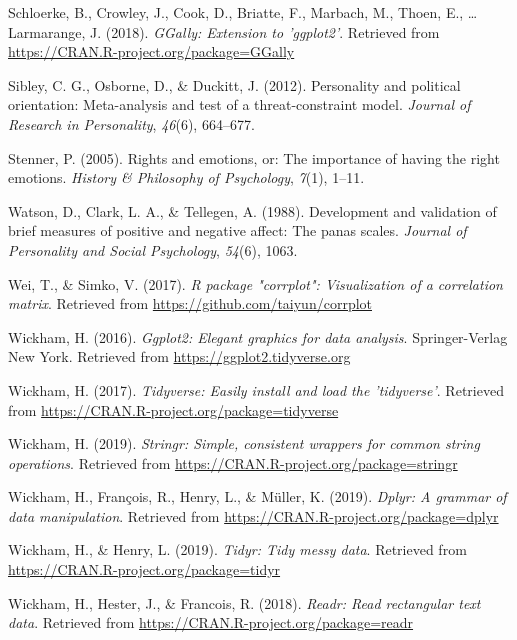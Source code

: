 \documentclass[man]{apa6}
\begin{document}
\leavevmode\hypertarget{ref-R-GGally}{}%
Schloerke, B., Crowley, J., Cook, D., Briatte, F., Marbach, M., Thoen, E., \ldots{} Larmarange, J. (2018). \emph{GGally: Extension to 'ggplot2'}. Retrieved from \url{https://CRAN.R-project.org/package=GGally}

\leavevmode\hypertarget{ref-sibley2012personality}{}%
Sibley, C. G., Osborne, D., \& Duckitt, J. (2012). Personality and political orientation: Meta-analysis and test of a threat-constraint model. \emph{Journal of Research in Personality}, \emph{46}(6), 664--677.

\leavevmode\hypertarget{ref-stenner2005rights}{}%
Stenner, P. (2005). Rights and emotions, or: The importance of having the right emotions. \emph{History \& Philosophy of Psychology}, \emph{7}(1), 1--11.

\leavevmode\hypertarget{ref-watson1988development}{}%
Watson, D., Clark, L. A., \& Tellegen, A. (1988). Development and validation of brief measures of positive and negative affect: The panas scales. \emph{Journal of Personality and Social Psychology}, \emph{54}(6), 1063.

\leavevmode\hypertarget{ref-R-corrplot2017}{}%
Wei, T., \& Simko, V. (2017). \emph{R package "corrplot": Visualization of a correlation matrix}. Retrieved from \url{https://github.com/taiyun/corrplot}

\leavevmode\hypertarget{ref-R-ggplot2}{}%
Wickham, H. (2016). \emph{Ggplot2: Elegant graphics for data analysis}. Springer-Verlag New York. Retrieved from \url{https://ggplot2.tidyverse.org}

\leavevmode\hypertarget{ref-R-tidyverse}{}%
Wickham, H. (2017). \emph{Tidyverse: Easily install and load the 'tidyverse'}. Retrieved from \url{https://CRAN.R-project.org/package=tidyverse}

\leavevmode\hypertarget{ref-R-stringr}{}%
Wickham, H. (2019). \emph{Stringr: Simple, consistent wrappers for common string operations}. Retrieved from \url{https://CRAN.R-project.org/package=stringr}

\leavevmode\hypertarget{ref-R-dplyr}{}%
Wickham, H., François, R., Henry, L., \& Müller, K. (2019). \emph{Dplyr: A grammar of data manipulation}. Retrieved from \url{https://CRAN.R-project.org/package=dplyr}

\leavevmode\hypertarget{ref-R-tidyr}{}%
Wickham, H., \& Henry, L. (2019). \emph{Tidyr: Tidy messy data}. Retrieved from \url{https://CRAN.R-project.org/package=tidyr}

\leavevmode\hypertarget{ref-R-readr}{}%
Wickham, H., Hester, J., \& Francois, R. (2018). \emph{Readr: Read rectangular text data}. Retrieved from \url{https://CRAN.R-project.org/package=readr}
\end{document}
